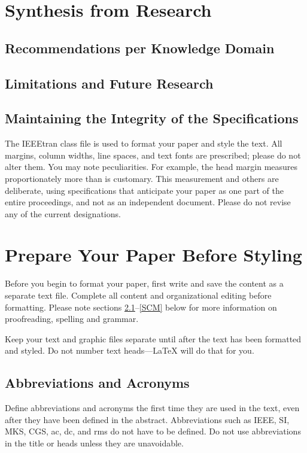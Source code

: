 \documentclass[conference]{IEEEtran}
\begin{document}
\section{Synthesis from Research}
\subsection{Recommendations per Knowledge Domain}
\subsection{Limitations and Future Research}

\printbibliography

\subsection{Maintaining the Integrity of the Specifications}

The IEEEtran class file is used to format your paper and style the text. All margins, 
column widths, line spaces, and text fonts are prescribed; please do not 
alter them. You may note peculiarities. For example, the head margin
measures proportionately more than is customary. This measurement 
and others are deliberate, using specifications that anticipate your paper 
as one part of the entire proceedings, and not as an independent document. 
Please do not revise any of the current designations.

\section{Prepare Your Paper Before Styling}
Before you begin to format your paper, first write and save the content as a 
separate text file. Complete all content and organizational editing before 
formatting. Please note sections \ref{AA}--\ref{SCM} below for more information on 
proofreading, spelling and grammar.

Keep your text and graphic files separate until after the text has been 
formatted and styled. Do not number text heads---{\LaTeX} will do that 
for you.

\subsection{Abbreviations and Acronyms}\label{AA}
Define abbreviations and acronyms the first time they are used in the text, 
even after they have been defined in the abstract. Abbreviations such as 
IEEE, SI, MKS, CGS, ac, dc, and rms do not have to be defined. Do not use 
abbreviations in the title or heads unless they are unavoidable.
\end{document}
